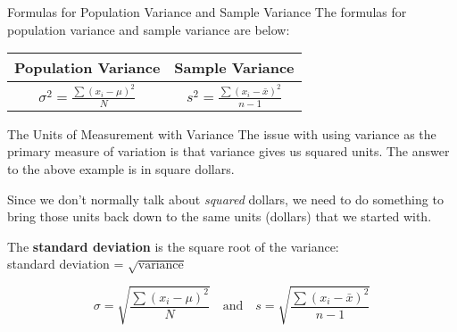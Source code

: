 \documentclass[t]{beamer}
\begin{document}
\begin{frame}{Formulas for Population Variance and Sample Variance}
The formulas for population variance and sample variance are below:	\newline\\

\begin{center}
\setlength{\extrarowheight}{7pt}
\begin{tabular}{c|c}
\textbf{Population Variance} & \textbf{Sample Variance} \\ \hline
$\sigma^2 = \frac{\sum (x_i-\mu)^2}{N}$	&	$s^2 = \frac{\sum (x_i-\bar{x})^2}{n-1}$
\end{tabular}
\end{center}
\end{frame}

\begin{frame}{The Units of Measurement with Variance}
The issue with using variance as the primary measure of variation is that variance gives us squared units. The answer to the above example is in square dollars.	\newline\\	\pause

Since we don't normally talk about \emph{squared} dollars, we need to do something to bring those units back down to the same units (dollars) that we started with.	\newline\\	\pause

The {\color{blue}\textbf{standard deviation}} is the square root of the variance: \newline\\ standard deviation = $\sqrt{\text{variance}}$

\[\sigma = \sqrt{\frac{\sum (x_i-\mu)^2}{N}} \quad \text{and} \quad s = \sqrt{\frac{\sum (x_i-\bar{x})^2}{n-1}}\]
\end{frame}
\end{document}

